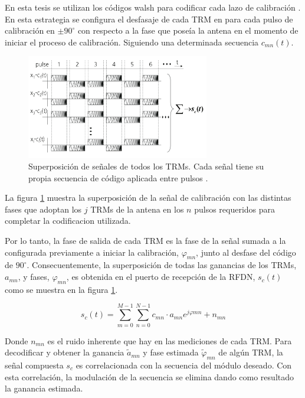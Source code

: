 En esta tesis se utilizan los códigos walsh para codificar cada lazo de calibración \cite{WalshCode}. En esta estrategia se
configura el desfasaje de cada TRM en para cada pulso de calibración en $\pm90^{\circ}$ con respecto a la fase que poseía la
antena en el momento de iniciar el proceso de calibración. Siguiendo una determinada secuencia $c_{mn}(t)$.

\begin{figure}
 \centering
 \includegraphics[width=8cm]{gfx/superposition_signals_classic.png}
 \caption{Superposición de señales de todos los TRMs. Cada señal tiene su propia secuencia de código aplicada entre pulsos
 \cite{Br2007}.}
 \label{fig:sup_sign_classic}
\end{figure}

La figura \ref{fig:sup_sign_classic} muestra la superposición de la señal de calibración con las distintas fases que adoptan
los $j$ TRMs de la antena en los $n$ pulsos requeridos para completar la codificacion utilizada.

Por lo tanto, la fase de salida de cada TRM es la fase de la señal sumada a la configurada previamente a iniciar la
calibración, $\varphi_{mn}$, junto al desfase del código de $90^{\circ}$. Consecuentemente, la superposición de todas las
ganancias de los TRMs, $a_{mn}$, y fases, $\varphi_{mn}$, es obtenida en el puerto de recepción de la RFDN, $s_c(t)$ como se
muestra en la figura \ref{fig:sup_sign_classic}.

\begin{equation}
	s_c(t) = \sum_{m=0}^{M-1}\sum_{n=0}^{N-1}c_{mn}\cdot a_{mn}e^{j\varphi{mn}} + n_{mn}
\end{equation}

Donde $n_{mn}$ es el ruido inherente que hay en las mediciones de cada TRM. Para decodificar y obtener la ganancia
$\tilde{a}_{mn}$ y fase estimada $\tilde\varphi_{mn}$ de algún TRM, la señal compuesta $s_c$ es correlacionada con
la secuencia del módulo deseado. Con esta correlación, la modulación de la secuencia se elimina dando como resultado
la ganancia estimada.

